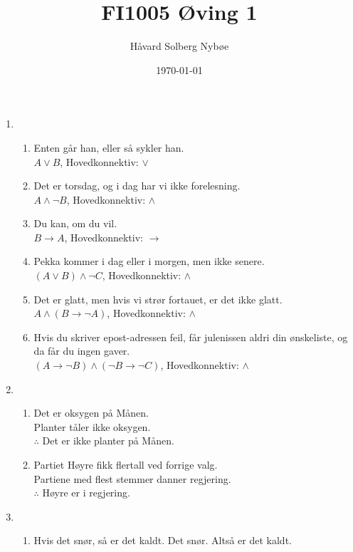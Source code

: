 \documentclass[a4paper, 12pt]{article}  %
\title{FI1005 Øving 1}                         %
\author{Håvard Solberg Nybøe}           %
\date{\today}                           %
\begin{document}
\maketitle


\begin{enumerate}
    \item [\boxed{1}]
    \begin{enumerate}
        \item Enten går han, eller så sykler han.
        \\ \(A \lor B\), Hovedkonnektiv: \(\lor\)
        \item Det er torsdag, og i dag har vi ikke forelesning.
        \\ \(A \land \neg B\), Hovedkonnektiv: \(\land\)
        \item Du kan, om du vil.
        \\ \(B \to A\), Hovedkonnektiv: \(\to\)
        \item Pekka kommer i dag eller i morgen, men ikke senere.
        \\ \((A \lor B)\land \neg C\), Hovedkonnektiv: \(\land\)
        \item Det er glatt, men hvis vi strør fortauet, er det ikke glatt.
        \\ \(A \land (B \to \neg A)\), Hovedkonnektiv: \(\land\)
        \item Hvis du skriver epost-adressen feil, får julenissen aldri din ønskeliste, og da får du ingen gaver.
        \\ \((A \to \neg B) \land (\neg B \to \neg C)\), Hovedkonnektiv: \(\land\)
    \end{enumerate}
    \item [\boxed{2}]
    \begin{enumerate}
        \item Det er oksygen på Månen. 
        \\ Planter tåler ikke oksygen. 
        \\ \(\therefore\) Det er ikke planter på Månen.
        \item Partiet Høyre fikk flertall ved forrige valg. 
        \\ Partiene med flest stemmer danner regjering. 
        \\ \(\therefore\) Høyre er i regjering.
    \end{enumerate}
    \item [\boxed{3}]
    \begin{enumerate}
        \item Hvis det snør, så er det kaldt. Det snør. Altså er det kaldt.

\end{enumerate}
\end{enumerate}
\end{document}
